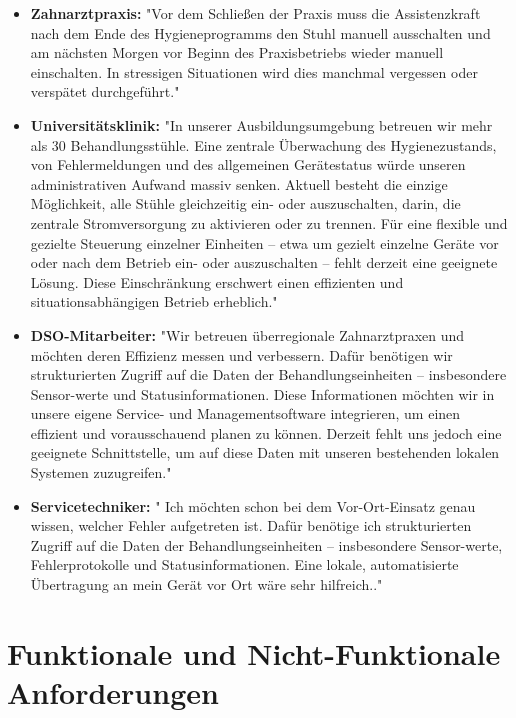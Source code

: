 \begin{itemize}
    \item \textbf{Zahnarztpraxis:} "Vor dem Schließen der Praxis muss die Assistenzkraft nach dem Ende des Hygieneprogramms den Stuhl manuell ausschalten und am nächsten Morgen vor Beginn des Praxisbetriebs wieder manuell einschalten. In stressigen Situationen wird dies manchmal vergessen oder verspätet durchgeführt."\\
    
    \item \textbf{Universitätsklinik:} "In unserer Ausbildungsumgebung betreuen wir mehr als 30 Behandlungsstühle. Eine zentrale Überwachung des Hygienezustands, von Fehlermeldungen und des allgemeinen Gerätestatus würde unseren administrativen Aufwand massiv senken. Aktuell besteht die einzige Möglichkeit, alle Stühle gleichzeitig ein- oder auszuschalten, darin, die zentrale Stromversorgung zu aktivieren oder zu trennen. Für eine flexible und gezielte Steuerung einzelner Einheiten – etwa um gezielt einzelne Geräte vor oder nach dem Betrieb ein- oder auszuschalten – fehlt derzeit eine geeignete Lösung. Diese Einschränkung erschwert einen effizienten und situationsabhängigen Betrieb erheblich."\\

    \item \textbf{DSO-Mitarbeiter:} "Wir betreuen überregionale Zahnarztpraxen und möchten deren Effizienz messen und verbessern.  Dafür benötigen wir strukturierten Zugriff auf die Daten der Behandlungseinheiten – insbesondere Sensor-werte und Statusinformationen. Diese Informationen möchten wir in unsere eigene Service- und Managementsoftware integrieren, um einen effizient und vorausschauend planen zu können. Derzeit fehlt uns jedoch eine geeignete Schnittstelle, um auf diese Daten mit unseren bestehenden lokalen Systemen zuzugreifen."\\

    \item \textbf{Servicetechniker:} " Ich möchten schon bei dem Vor-Ort-Einsatz genau wissen, welcher Fehler aufgetreten ist. Dafür benötige ich strukturierten Zugriff auf die Daten der Behandlungseinheiten – insbesondere Sensor-werte, Fehlerprotokolle und Statusinformationen. Eine lokale, automatisierte Übertragung an mein Gerät vor Ort wäre sehr hilfreich.."
\end{itemize}

\section{Funktionale und Nicht-Funktionale Anforderungen}

